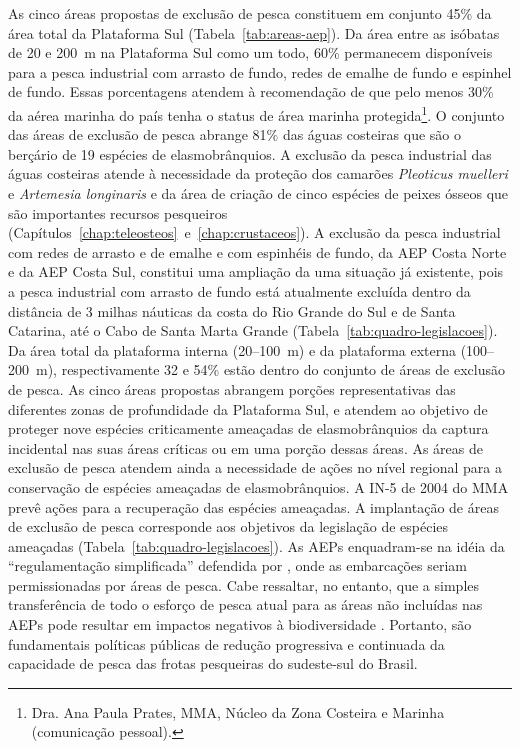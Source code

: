 \documentclass[a4paper,11pt,twoside,showtrims,onecolumn,openright,final]{memoir}
\begin{document}
As cinco áreas propostas de exclusão de pesca constituem em conjunto 45\% da área total 
da Plataforma Sul (Tabela~\ref{tab:areas-aep}).  Da área entre as isóbatas de 20 e 200~m na Plataforma Sul 
como um todo, 60\% permanecem disponíveis para a pesca industrial com arrasto de fundo, 
redes de emalhe de fundo e espinhel de fundo. Essas porcentagens atendem à recomendação de que pelo menos 30\% 
da aérea marinha do país tenha o status 
de área marinha protegida\footnote{Dra. Ana Paula Prates, MMA, Núcleo da Zona Costeira e Marinha (comunicação pessoal).}. %
O conjunto das áreas de exclusão de pesca  abrange 81\% das águas costeiras 
que são o berçário de 19 espécies de elasmobrânquios. A exclusão da pesca industrial das águas costeiras 
atende à necessidade da proteção dos camarões \emph{Pleoticus muelleri} e \emph{Artemesia longinaris} e da área de 
criação de cinco espécies de peixes ósseos que são importantes 
recursos pesqueiros (Capítulos~\ref{chap:teleosteos}~e~\ref{chap:crustaceos}). %
A exclusão da pesca industrial com redes de arrasto e de emalhe e com espinhéis de fundo, 
da AEP Costa Norte e da AEP Costa Sul, constitui uma ampliação da uma situação já existente, 
pois a pesca industrial com arrasto de fundo está atualmente excluída dentro da distância de 3 milhas 
náuticas da costa do Rio Grande do Sul e de Santa Catarina, até o Cabo de Santa Marta Grande (Tabela~\ref{tab:quadro-legislacoes}).
Da área total da plataforma interna (20--100~m) e da plataforma externa (100--200~m),
respectivamente  32 e 54\% estão dentro do conjunto de áreas de exclusão de pesca. As cinco áreas propostas
abrangem porções representativas das diferentes zonas de profundidade da Plataforma Sul, e atendem ao 
objetivo de proteger nove espécies criticamente ameaçadas de elasmobrânquios da captura incidental nas 
suas áreas críticas ou em uma porção dessas áreas.  As áreas de exclusão de pesca atendem ainda 
a necessidade de ações no nível regional para a conservação de espécies ameaçadas de elasmobrânquios.  
A IN-5 de 2004 do MMA prevê ações para a recuperação das espécies ameaçadas. A implantação de áreas 
de exclusão de pesca corresponde aos objetivos da legislação de espécies ameaçadas (Tabela~\ref{tab:quadro-legislacoes}).
As AEPs enquadram-se na idéia da ``regulamentação simplificada''
defendida por \citet{diasneto2003}, onde as embarcações seriam permissionadas por áreas de pesca.
Cabe ressaltar, no entanto, que a simples transferência
de todo o esforço de pesca atual para as áreas não incluídas nas AEPs pode resultar em impactos negativos
à biodiversidade \citep{baum2003}. Portanto, são fundamentais políticas públicas de redução 
progressiva e continuada da capacidade de pesca das frotas pesqueiras do sudeste-sul do Brasil.
\end{document}
